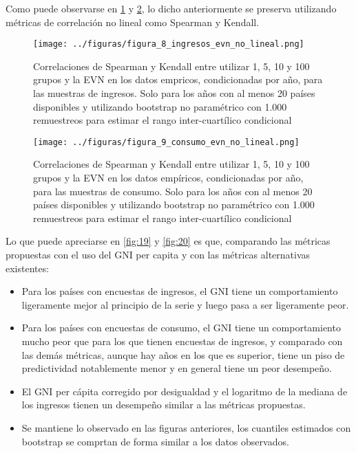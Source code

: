 Como puede observarse en \ref{fig:8} y \ref{fig:9}, lo dicho anteriormente se preserva utilizando métricas de correlación no lineal como Spearman y Kendall.

\begin{figure}[H] %
    \centering %
    \texttt{[image: ../figuras/figura\_8\_ingresos\_evn\_no\_lineal.png]} %
    \caption{Correlaciones de Spearman y Kendall entre utilizar 1, 5, 10 y 100 grupos y la EVN en los datos empricos, condicionadas por año, para las muestras de ingresos. Solo para los años con al menos 20 países disponibles y utilizando bootstrap no paramétrico con 1.000 remuestreos para estimar el rango inter-cuartílico condicional}
    \label{fig:8} %
\end{figure}



\begin{figure}[H] %
    \centering %
    \texttt{[image: ../figuras/figura\_9\_consumo\_evn\_no\_lineal.png]} %
    \caption{Correlaciones de Spearman y Kendall entre utilizar 1, 5, 10 y 100 grupos y la EVN en los datos empíricos, condicionadas por año, para las muestras de consumo. Solo para los años con al menos 20 países disponibles y utilizando bootstrap no paramétrico con 1.000 remuestreos para estimar el rango inter-cuartílico condicional}
    \label{fig:9} %
\end{figure}

Lo que puede apreciarse en \ref{fig:19} y \ref{fig:20} es que, comparando las métricas propuestas con el uso del GNI per capita y con las métricas alternativas existentes:


\begin{itemize}
    \item  Para los países con encuestas de ingresos, el GNI tiene un comportamiento ligeramente mejor al principio de la serie y luego pasa a ser ligeramente peor.
    \item Para los países con encuestas de consumo, el GNI tiene un comportamiento mucho peor que para los que tienen encuestas de ingresos, y comparado con las demás métricas, aunque hay años en los que es superior, tiene un piso de predictividad notablemente menor y en general tiene un peor desempeño.
    \item El GNI per cápita corregido por desigualdad y el logaritmo de la mediana de los ingresos tienen un desempeño similar a las métricas propuestas.
    \item Se mantiene lo observado en las figuras anteriores, los cuantiles estimados con bootstrap se comprtan de forma similar a los datos observados.
\end{itemize}



